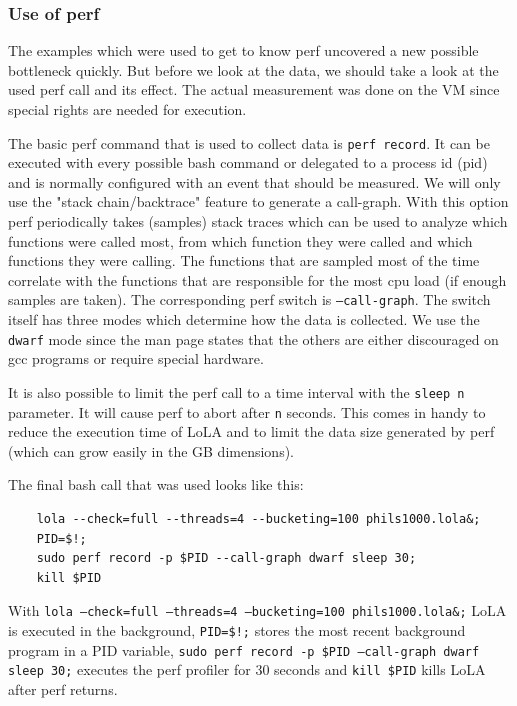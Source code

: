 \subsubsection{Use of perf}
The examples which were used to get to know perf uncovered a new possible bottleneck quickly. But before we look at the data, we should take a look at the used perf call and its effect. The actual measurement was done on the VM since special rights are needed for execution.

The basic perf command that is used to collect data is \texttt{perf record}. It can be executed with every possible bash command or delegated to a process id (pid) and is normally configured with an event that should be measured. We will only use the "stack chain/backtrace" feature to generate a call-graph. With this option perf periodically takes (samples) stack traces which can be used to analyze which functions were called most, from which function they were called and which functions they were calling. The functions that are sampled most of the time correlate with the functions that are responsible for the most cpu load (if enough samples are taken). The corresponding perf switch is \texttt{--call-graph}. The switch itself has three modes which determine how the data is collected. We use the \texttt{dwarf} mode since the man page states that the others are either discouraged on gcc programs or require special hardware.

It is also possible to limit the perf call to a time interval with the \texttt{sleep n} parameter. It will cause perf to abort after \texttt{n} seconds. This comes in handy to reduce the execution time of LoLA and to limit the data size generated by perf (which can grow easily in the GB dimensions).

The final bash call that was used looks like this:
\begin{lstlisting}
    lola --check=full --threads=4 --bucketing=100 phils1000.lola&;
    PID=$!;
    sudo perf record -p $PID --call-graph dwarf sleep 30;
    kill $PID
\end{lstlisting}
With \texttt{lola --check=full --threads=4 --bucketing=100 phils1000.lola\&;} LoLA  is executed in the background, \texttt{PID=\$!;} stores the most recent background program in a PID variable, \texttt{sudo perf record -p \$PID --call-graph dwarf sleep 30;} executes the perf profiler for 30 seconds and \texttt{kill \$PID} kills LoLA after perf returns.

